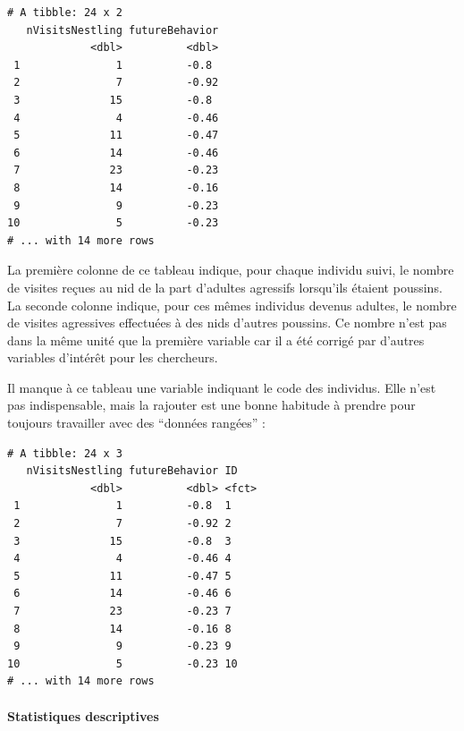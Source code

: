 \documentclass[
  a4paper,
]{article}
\newenvironment{Shaded}{\begin{snugshade}}{\end{snugshade}}
\newcommand{\DataTypeTok}[1]{\textcolor[rgb]{0.00,0.34,0.68}{#1}}
\newcommand{\DecValTok}[1]{\textcolor[rgb]{0.69,0.50,0.00}{#1}}
\newcommand{\KeywordTok}[1]{\textcolor[rgb]{0.12,0.11,0.11}{\textbf{#1}}}
\newcommand{\NormalTok}[1]{\textcolor[rgb]{0.12,0.11,0.11}{#1}}
\newcommand{\OperatorTok}[1]{\textcolor[rgb]{0.12,0.11,0.11}{#1}}
\newcommand{\StringTok}[1]{\textcolor[rgb]{0.75,0.01,0.01}{#1}}
\begin{document}
\begin{verbatim}
# A tibble: 24 x 2
   nVisitsNestling futureBehavior
             <dbl>          <dbl>
 1               1          -0.8 
 2               7          -0.92
 3              15          -0.8 
 4               4          -0.46
 5              11          -0.47
 6              14          -0.46
 7              23          -0.23
 8              14          -0.16
 9               9          -0.23
10               5          -0.23
# ... with 14 more rows
\end{verbatim}

La première colonne de ce tableau indique, pour chaque individu suivi, le nombre de visites reçues au nid de la part d'adultes agressifs lorsqu'ils étaient poussins. La seconde colonne indique, pour ces mêmes individus devenus adultes, le nombre de visites agressives effectuées à des nids d'autres poussins. Ce nombre n'est pas dans la même unité que la première variable car il a été corrigé par d'autres variables d'intérêt pour les chercheurs.

Il manque à ce tableau une variable indiquant le code des individus. Elle n'est pas indispensable, mais la rajouter est une bonne habitude à prendre pour toujours travailler avec des ``données rangées'' :

\begin{Shaded}
\end{Shaded}

\begin{verbatim}
# A tibble: 24 x 3
   nVisitsNestling futureBehavior ID   
             <dbl>          <dbl> <fct>
 1               1          -0.8  1    
 2               7          -0.92 2    
 3              15          -0.8  3    
 4               4          -0.46 4    
 5              11          -0.47 5    
 6              14          -0.46 6    
 7              23          -0.23 7    
 8              14          -0.16 8    
 9               9          -0.23 9    
10               5          -0.23 10   
# ... with 14 more rows
\end{verbatim}

\hypertarget{statistiques-descriptives-4}{%
\paragraph{Statistiques descriptives}\label{statistiques-descriptives-4}}
\end{document}
